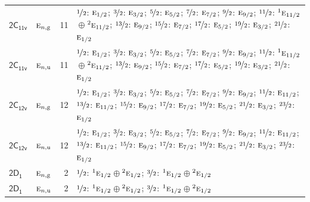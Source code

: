 \documentclass[10pt,a4paper]{article}
\numberwithin{equation}{section}
\newcommand{\grp}[1]{\mathsf{#1}}
\newcommand{\irr}[1]{\text{\normalfont\scshape #1}}
\newcommand{\conjpair}[1]{{}^{#1}}
\newcommand{\ptag}[1]{\mathrm{#1}}
\newlength{\fillwidth}\newlength{\cellwidth}\newlength{\colwidth}
\begin{document}
{\begin{longtable}{@{}llr>{\RaggedRight\arraybackslash}p{\fillwidth}@{}}
\href{2C11v.pdf}{$\grp{2C_{11v}}$} & $\irr{e}_{n,\ptag{g}}$ & 11 & $\nicefrac{1}{2}$: $\irr{e}_{1/2}$; $\nicefrac{3}{2}$: $\irr{e}_{3/2}$; $\nicefrac{5}{2}$: $\irr{e}_{5/2}$; $\nicefrac{7}{2}$: $\irr{e}_{7/2}$; $\nicefrac{9}{2}$: $\irr{e}_{9/2}$; $\nicefrac{11}{2}$: $\conjpair{1}\irr{e}_{11/2}$${}\oplus{}$$\conjpair{2}\irr{e}_{11/2}$; $\nicefrac{13}{2}$: $\irr{e}_{9/2}$; $\nicefrac{15}{2}$: $\irr{e}_{7/2}$; $\nicefrac{17}{2}$: $\irr{e}_{5/2}$; $\nicefrac{19}{2}$: $\irr{e}_{3/2}$; $\nicefrac{21}{2}$: $\irr{e}_{1/2}$\\
\href{2C11v.pdf}{$\grp{2C_{11v}}$} & $\irr{e}_{n,\ptag{u}}$ & 11 & $\nicefrac{1}{2}$: $\irr{e}_{1/2}$; $\nicefrac{3}{2}$: $\irr{e}_{3/2}$; $\nicefrac{5}{2}$: $\irr{e}_{5/2}$; $\nicefrac{7}{2}$: $\irr{e}_{7/2}$; $\nicefrac{9}{2}$: $\irr{e}_{9/2}$; $\nicefrac{11}{2}$: $\conjpair{1}\irr{e}_{11/2}$${}\oplus{}$$\conjpair{2}\irr{e}_{11/2}$; $\nicefrac{13}{2}$: $\irr{e}_{9/2}$; $\nicefrac{15}{2}$: $\irr{e}_{7/2}$; $\nicefrac{17}{2}$: $\irr{e}_{5/2}$; $\nicefrac{19}{2}$: $\irr{e}_{3/2}$; $\nicefrac{21}{2}$: $\irr{e}_{1/2}$\\
\href{2C12v.pdf}{$\grp{2C_{12v}}$} & $\irr{e}_{n,\ptag{g}}$ & 12 & $\nicefrac{1}{2}$: $\irr{e}_{1/2}$; $\nicefrac{3}{2}$: $\irr{e}_{3/2}$; $\nicefrac{5}{2}$: $\irr{e}_{5/2}$; $\nicefrac{7}{2}$: $\irr{e}_{7/2}$; $\nicefrac{9}{2}$: $\irr{e}_{9/2}$; $\nicefrac{11}{2}$: $\irr{e}_{11/2}$; $\nicefrac{13}{2}$: $\irr{e}_{11/2}$; $\nicefrac{15}{2}$: $\irr{e}_{9/2}$; $\nicefrac{17}{2}$: $\irr{e}_{7/2}$; $\nicefrac{19}{2}$: $\irr{e}_{5/2}$; $\nicefrac{21}{2}$: $\irr{e}_{3/2}$; $\nicefrac{23}{2}$: $\irr{e}_{1/2}$\\
\href{2C12v.pdf}{$\grp{2C_{12v}}$} & $\irr{e}_{n,\ptag{u}}$ & 12 & $\nicefrac{1}{2}$: $\irr{e}_{1/2}$; $\nicefrac{3}{2}$: $\irr{e}_{3/2}$; $\nicefrac{5}{2}$: $\irr{e}_{5/2}$; $\nicefrac{7}{2}$: $\irr{e}_{7/2}$; $\nicefrac{9}{2}$: $\irr{e}_{9/2}$; $\nicefrac{11}{2}$: $\irr{e}_{11/2}$; $\nicefrac{13}{2}$: $\irr{e}_{11/2}$; $\nicefrac{15}{2}$: $\irr{e}_{9/2}$; $\nicefrac{17}{2}$: $\irr{e}_{7/2}$; $\nicefrac{19}{2}$: $\irr{e}_{5/2}$; $\nicefrac{21}{2}$: $\irr{e}_{3/2}$; $\nicefrac{23}{2}$: $\irr{e}_{1/2}$\\
\href{2D1.pdf}{$\grp{2D_{1}}$} & $\irr{e}_{n,\ptag{g}}$ & 2 & $\nicefrac{1}{2}$: $\conjpair{1}\irr{e}_{1/2}$${}\oplus{}$$\conjpair{2}\irr{e}_{1/2}$; $\nicefrac{3}{2}$: $\conjpair{1}\irr{e}_{1/2}$${}\oplus{}$$\conjpair{2}\irr{e}_{1/2}$\\
\href{2D1.pdf}{$\grp{2D_{1}}$} & $\irr{e}_{n,\ptag{u}}$ & 2 & $\nicefrac{1}{2}$: $\conjpair{1}\irr{e}_{1/2}$${}\oplus{}$$\conjpair{2}\irr{e}_{1/2}$; $\nicefrac{3}{2}$: $\conjpair{1}\irr{e}_{1/2}$${}\oplus{}$$\conjpair{2}\irr{e}_{1/2}$\\

\end{longtable}}
\end{document}

